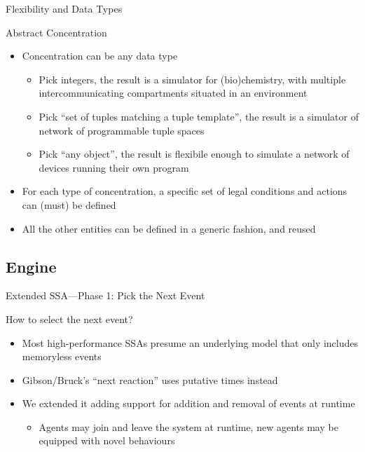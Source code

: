 \documentclass[presentation]{beamer} %
\begin{document}
\begin{frame}{Flexibility and Data Types}
  \begin{block}{Abstract Concentration}
    \begin{itemize}
    \item Concentration can be any data type
      \begin{itemize}
        \item Pick integers, the result is a simulator for (bio)chemistry, with multiple intercommunicating compartments situated in an environment \cite{drosophila}
        \item Pick ``set of tuples matching a tuple template'', the result is a simulator of network of programmable tuple spaces
        \item Pick ``any object'', the result is flexibile enough to simulate a network of devices running their own program \cite{protelis}
      \end{itemize}
    \item For each type of concentration, a specific set of legal conditions and actions can (must) be defined
    \item All the other entities can be defined in a generic fashion, and reused 
    \end{itemize}
  \end{block}
\end{frame}

\subsection{Engine}

\begin{frame}{Extended SSA---Phase 1: Pick the Next Event}
  \begin{block}{How to select the next event?}
    \begin{itemize}
      \item Most high-performance SSAs presume an underlying model that only includes memoryless events \cite{slepoy2008}
      \item Gibson/Bruck's ``next reaction'' uses putative times instead
      \item We extended it adding support for addition and removal of events at runtime
      \begin{itemize}
        \item Agents may join and leave the system at runtime, new agents may be equipped with novel behaviours
      \end{itemize}
    \end{itemize}
  \end{block}
\end{frame}
\end{document}
